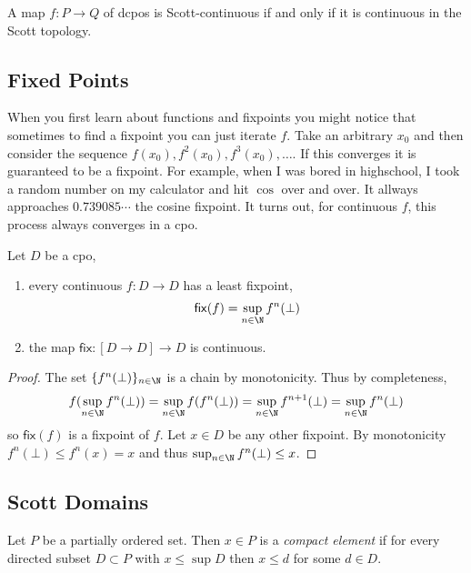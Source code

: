 \documentclass[12pt]{article}
\begin{document}
\begin{prop}
A map $f : P \to Q$ of dcpos is Scott-continuous if and only if it is continuous in the Scott topology.  
\end{prop}


\subsection{Fixed Points}

\renewcommand{\fix}{\mathsf{fix}}
\renewcommand{\it}{\mathsf{it}}

When you first learn about functions and fixpoints you might notice that sometimes to find a fixpoint you can just iterate $f$. Take an arbitrary $x_0$ and then consider the sequence $f(x_0), f^2(x_0),  f^3(x_0), \dots$. If this converges it is guaranteed to be a fixpoint. For example, when I was bored in highschool, I took a random number on my calculator and hit $\cos$ over and over. It allways approaches $0.739085 \cdots$ the cosine fixpoint. It turns out, for continuous $f$, this process always converges in a cpo. 

\begin{theorem}[Kleene]
Let $D$ be a cpo,
\begin{enumerate}
\item every continuous $f : D \to D$ has a least fixpoint,
\[ \fix(f) = \sup_{n \in \N} f^n(\bot) \]
\item the map $\fix : [D \to D] \to D$ is continuous. 
\end{enumerate}
\end{theorem}

\begin{proof}
The set $\{ f^n(\bot) \}_{n \in \N}$ is a chain by monotonicity. Thus by completeness,
\[ f(\sup_{n \in \N} f^n(\bot)) = \sup_{n \in \N} f(f^n(\bot)) = \sup_{n \in \N} f^{n+1}(\bot) = \sup_{n \in \N} f^n(\bot) \]
so $\fix(f)$ is a fixpoint of $f$. Let $x \in D$ be any other fixpoint. By monotonicity $f^n(\bot) \le f^n(x) = x$ and thus $\sup_{n \in \N} f^n(\bot) \le x$.
\end{proof}

\subsection{Scott Domains}

\begin{defn}
Let $P$ be a partially ordered set. Then $x \in P$ is a \textit{compact element} if for every directed subset $D \subset P$ with $x \le \sup{D}$ then $x \le d$ for some $d \in D$.
\end{defn}
\end{document}

